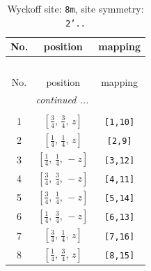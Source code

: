 \documentclass[fleqn,8pt]{jsarticle}
\begin{document}
\begin{longtable}{ccc}
\caption{Wyckoff site: {\tt 8m}, site symmetry: {\tt 2'..}}
 \\
 \hline \hline
No. & position & mapping \\ \hline \endfirsthead

\multicolumn{2}{l}{\tablename\ \thetable{}} \\
 \hline \hline
No. & position & mapping \\ \hline \endhead

 \hline \hline
\multicolumn{2}{r}{\footnotesize\it continued ...} \\ \endfoot

 \hline \hline
\multicolumn{2}{r}{} \\ \endlastfoot

1 & $\left[ \frac{3}{4},\, \frac{3}{4},\, z \right]$ & {\tt [1,10]} \\ \hline
2 & $\left[ \frac{1}{4},\, \frac{1}{4},\, z \right]$ & {\tt [2,9]} \\ \hline
3 & $\left[ \frac{1}{4},\, \frac{1}{4},\, - z \right]$ & {\tt [3,12]} \\ \hline
4 & $\left[ \frac{3}{4},\, \frac{3}{4},\, - z \right]$ & {\tt [4,11]} \\ \hline
5 & $\left[ \frac{3}{4},\, \frac{1}{4},\, - z \right]$ & {\tt [5,14]} \\ \hline
6 & $\left[ \frac{1}{4},\, \frac{3}{4},\, - z \right]$ & {\tt [6,13]} \\ \hline
7 & $\left[ \frac{3}{4},\, \frac{1}{4},\, z \right]$ & {\tt [7,16]} \\ \hline
8 & $\left[ \frac{1}{4},\, \frac{3}{4},\, z \right]$ & {\tt [8,15]} \\
\end{longtable}
\renewcommand{\arraystretch}{1.2}
\end{document}
